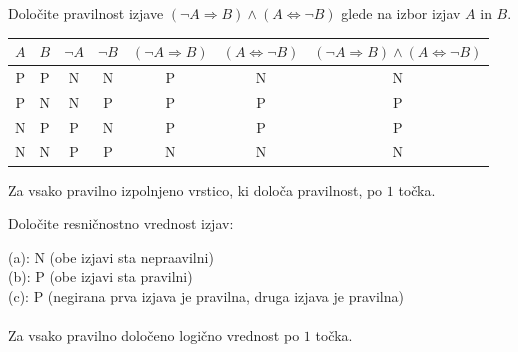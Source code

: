 \documentclass[addpoints]{exam}
\begin{document}
\begin{questions}

    
    \question[4]
    Določite pravilnost izjave $(\lnot A\Rightarrow  B)\land(A\Leftrightarrow \lnot B)$ glede na izbor izjav $A$ in $B$.

    \begin{solution}[8cm]
        \begin{table}[H]
            \begin{tabular}{ccccccc}
             $A$ & $B$ & $\lnot A$ & $\lnot B$ & $(\lnot A\Rightarrow B)$ & $(A\Leftrightarrow \lnot B)$ & $(\lnot A\Rightarrow B)\land(A\Leftrightarrow \lnot B)$\\ \hline
             P & P & N & N & P & N & N \\ 
             P & N & N & P & P & P & P \\
             N & P & P & N & P & P & P \\
             N & N & P & P & N & N & N
            \end{tabular}
        \end{table}
        Za vsako pravilno izpolnjeno vrstico, ki določa pravilnost, po $1$ točka.
    \end{solution}




    \question[3]
    Določite resničnostno vrednost izjav:

    \begin{solution}
        (a): N (obe izjavi sta nepraavilni) \\
        (b): P (obe izjavi sta pravilni) \\
        (c): P (negirana prva izjava je pravilna, druga izjava je pravilna) \\ \\
        Za vsako pravilno določeno logično vrednost po $1$ točka.
    \end{solution}




\end{questions}
\end{document}
